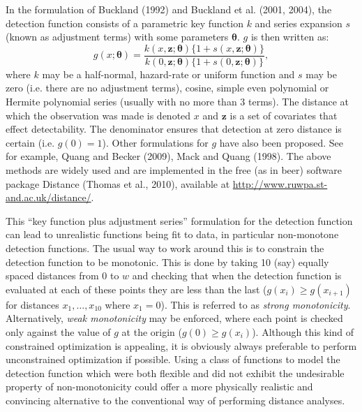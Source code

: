 \documentclass[useAMS,referee, usegraphicx]{biom}
\begin{document}
In the formulation of  Buckland (1992) and Buckland et al. (2001, 2004), the detection function consists of a parametric key function $k$ and series expansion $s$ (known as adjustment terms) with some parameters $\bm{\theta}$. $g$ is then written as:
\begin{equation*}
g(x; \bm{\theta}) = \frac{k(x, \mathbf{z}; \bm{\theta}) \{1+s(x, \mathbf{z}; \bm{\theta})\}}{k(0, \mathbf{z}; \bm{\theta}) \{1+s(0, \mathbf{z}; \bm{\theta})\}},
\end{equation*}
where $k$ may be a half-normal, hazard-rate or uniform function and $s$ may be zero (i.e. there are no adjustment terms), cosine, simple even polynomial or Hermite polynomial series (usually with no more than 3 terms). The distance at which the observation was made is denoted $x$ and $\mathbf{z}$ is a set of covariates that effect detectability. The denominator ensures that detection at zero distance is certain (i.e. $g(0)=1$). Other formulations for $g$ have also been proposed. See for example, Quang and Becker (2009), Mack and Quang (1998). The above methods are widely used and are implemented in the free (as in beer) software package Distance (Thomas et al., 2010), available at \url{http://www.ruwpa.st-and.ac.uk/distance/}.

This ``key function plus adjustment series'' formulation for the detection function can lead to unrealistic functions being fit to data, in particular non-monotone detection functions. The usual way to work around this is to constrain the detection function to be monotonic. This is done by taking 10 (say) equally spaced distances from $0$ to $w$ and checking that when the detection function is evaluated at each of these points they are less than the last ($g(x_i)\geq g(x_{i+1})$ for distances $x_1,\dots, x_{10}$ where $x_1=0$). This is referred to as \textit{strong monotonicity}. Alternatively, \textit{weak monotonicity} may be enforced, where each point is checked only against the value of $g$ at the origin ($g(0)\geq g(x_i)$). Although this kind of constrained optimization is appealing, it is obviously always preferable to perform unconstrained optimization if possible. Using a class of functions to model the detection function which were both flexible and did not exhibit the undesirable property of non-monotonicity could offer a more physically realistic and convincing alternative to the conventional way of performing distance analyses.
\end{document}
